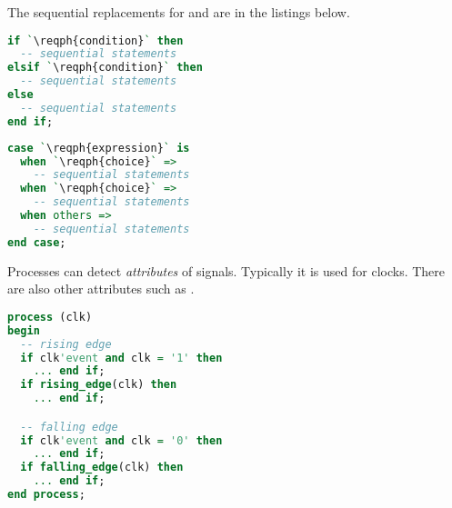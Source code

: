 The sequential replacements for  and  are in the listings below.
\begin{lstlisting}[language=vhdl]
if `\reqph{condition}` then
  -- sequential statements 
elsif `\reqph{condition}` then
  -- sequential statements 
else
  -- sequential statements 
end if;
\end{lstlisting}
\begin{lstlisting}[language=vhdl]
case `\reqph{expression}` is
  when `\reqph{choice}` =>
    -- sequential statements
  when `\reqph{choice}` =>
    -- sequential statements
  when others =>
    -- sequential statements
end case;
\end{lstlisting}

Processes can detect \emph{attributes} of signals. Typically it is used for
clocks. There are also other attributes such as .
\begin{lstlisting}[language=vhdl]
process (clk)
begin
  -- rising edge
  if clk'event and clk = '1' then
    ... end if;
  if rising_edge(clk) then
    ... end if;

  -- falling edge
  if clk'event and clk = '0' then
    ... end if;
  if falling_edge(clk) then
    ... end if;
end process;
\end{lstlisting}

